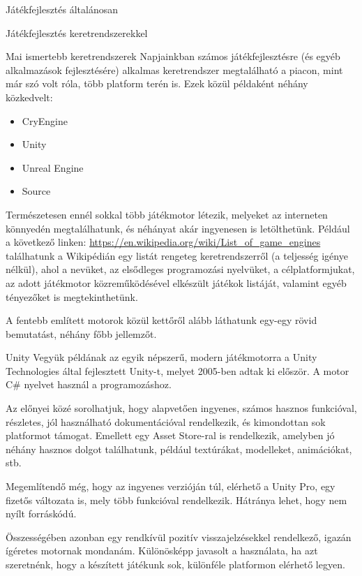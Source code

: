 \begin{MyChapter}{Játékfejlesztés általánosan}
\begin{MySection}{Játékfejlesztés keretrendszerekkel}
		\begin{MySubSection}{Mai ismertebb keretrendszerek}
		Napjainkban számos játékfejlesztésre (és egyéb alkalmazások fejlesztésére) alkalmas keretrendszer megtalálható a piacon, mint már szó volt róla, több platform terén is.
		\newline \newline
		Ezek közül példaként néhány közkedvelt:
		\begin{itemize}
			\item CryEngine %
			\item Unity
			\item Unreal Engine
			\item Source
		\end{itemize}
		Természetesen ennél sokkal több játékmotor létezik, melyeket az interneten könnyedén megtalálhatunk, és néhányat akár ingyenesen is letölthetünk.
		Például a következő linken: \url{https://en.wikipedia.org/wiki/List\_of\_game\_engines} találhatunk a Wikipédián egy listát rengeteg keretrendszerről (a teljesség igénye nélkül), ahol a nevüket, az elsődleges programozási nyelvüket, a célplatformjukat, az adott játékmotor közreműködésével elkészült játékok listáját, valamint egyéb tényezőket is megtekinthetünk.
		
		A fentebb említett motorok közül kettőről alább láthatunk egy-egy rövid bemutatást, néhány főbb jellemzőt.
		\end{MySubSection}
	
		\begin{MySubSection}{Unity}
			Vegyük példának az egyik népszerű, modern játékmotorra a Unity Technologies által fejlesztett Unity-t, melyet 2005-ben adtak ki először. A motor C\# nyelvet használ a programozáshoz.
			
			Az előnyei közé sorolhatjuk, hogy alapvetően ingyenes, számos hasznos funkcióval, részletes, jól használható dokumentációval rendelkezik, és kimondottan sok platformot támogat. Emellett egy Asset Store-ral is rendelkezik, amelyben jó néhány hasznos dolgot találhatunk, például textúrákat, modelleket, animációkat, stb.
			
			Megemlítendő még, hogy az ingyenes verzióján túl, elérhető a Unity Pro, egy fizetős változata is, mely több funkcióval rendelkezik.
			Hátránya lehet, hogy nem nyílt forráskódú.
			
			Összességében azonban egy rendkívül pozitív visszajelzésekkel rendelkező, igazán ígéretes motornak mondanám. Különösképp javasolt a használata, ha azt szeretnénk, hogy a készített játékunk sok, különféle platformon elérhető legyen.


\end{MySubSection}
\end{MySection}
\end{MyChapter}
